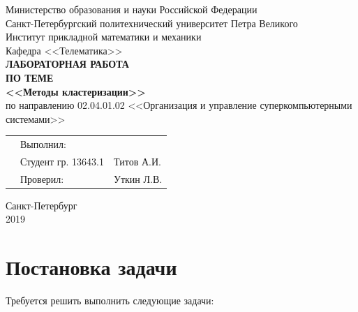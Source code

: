 \documentclass[]{article}
\numberwithin{equation}{section}
\begin{document}
    \thispagestyle{empty}
	\begin{center}
		Министерство образования и науки Российской Федерации\\
		Санкт-Петербургский политехнический университет Петра Великого \\
		Институт прикладной математики и механики\\
		Кафедра <<Телематика>>\\
		\vspace{5cm}
		\textbf{\textbf{ЛАБОРАТОРНАЯ РАБОТА}}\\
        \vspace{0.5cm}
        \textbf{ПО ТЕМЕ}\\
        \vspace{0.5cm}
		\textbf{\textbf{<<Методы кластеризации>>}}\\
		\vspace{3cm}
		по направлению 02.04.01.02 <<Организация и управление суперкомпьютерными системами>>
	\end{center}
	\vspace{2cm}
	\begin{tabular} {l l l}
	\hspace{9.5cm} & Выполнил: & \\
	& Студент гр. 13643.1 & Титов А.И.\\
	& Проверил: & Уткин Л.В.
	\end{tabular}
	\vspace{4.5cm}
	\begin{center}
		Санкт-Петербург\\
		2019
    \end{center}


	\renewcommand\contentsname{Оглавление}
	\tableofcontents

    \newpage
    \section*{Постановка задачи}

    Требуется решить выполнить следующие задачи:
\end{document}
